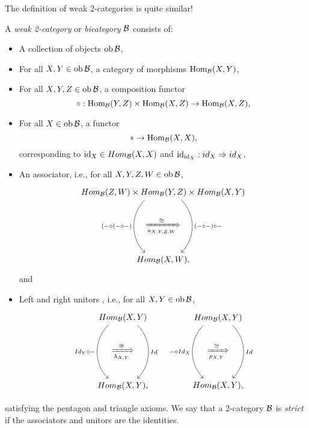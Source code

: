 The definition of weak 2-categories is quite similar!

\begin{dfn}
	A \emph{weak 2-category} or \emph{bicategory} $\mathcal{B}$ consists of:
	\begin{itemize}
		\item A collection of objects $\operatorname{ob} \mathcal{B}$,
		\item For all $X, Y \in \operatorname{ob} \mathcal{B}$, a category of morphisms $\operatorname{Hom}_{\mathcal{B}}(X, Y)$,
		\item For all $X, Y, Z \in \operatorname{ob} \mathcal{B}$, a composition functor 
		\begin{equation*}
			\circ: \operatorname{Hom}_{\mathcal{B}}(Y, Z) \times \operatorname{Hom}_{\mathcal{B}}(X, Z) \to \operatorname{Hom}_{\mathcal{B}}(X,Z),
		\end{equation*}
		\item For all $X \in \operatorname{ob} \mathcal{B}$, a functor 
		$$* \to \operatorname{Hom}_{\mathcal{B}}(X, X),$$
		corresponding to $\operatorname{id}_X\in Hom_{\mathcal{B}}(X,X)$ and $\operatorname{id}_{\operatorname{id}_X}:id_X\Rightarrow id_X$,

		\item An associator, i.e., for all $X,Y,Z,W \in \operatorname{ob} \mathcal{B}$,
		\begin{equation*}
			\begin{tikzcd}
				Hom_{\Bc}(Z,W)\times Hom_{\Bc}(Y,Z) \times Hom_{\Bc}(X,Y) \arrow[dd, shift left=-3ex, out=-135,in=135,"(-\circ(-\circ -)"']\arrow[dd, shift left=3ex, out=-45,in=45, "(-\circ -)\circ -"]\\
				\xRightarrow[a_{X,Y,Z,W}]{\cong}\\
				Hom_{\Bc}(X,W),
			\end{tikzcd}
		\end{equation*}
		and
		\item Left and right unitors , i.e., for all $X,Y \in \operatorname{ob} \mathcal{B}$,
		\begin{equation*}
			\begin{aligned}
			\begin{tikzcd}
				Hom_{\Bc}(X,Y)\arrow[dd, shift left=-2ex, out=-135,in=135,"Id_Y \circ -"']\arrow[dd, shift left=2ex, out=-45,in=45, "Id"]\\
				\xRightarrow[\lambda_{X,Y}]{\cong}\\
				Hom_{\Bc}(X,Y),
			\end{tikzcd}
			&&\begin{tikzcd}
				Hom_{\Bc}(X,Y)\arrow[dd, shift left=-2ex, out=-135,in=135,"- \circ Id_X"']\arrow[dd, shift left=2ex, out=-45,in=45, "Id"]\\
				\xRightarrow[\rho_{X,Y}]{\cong}\\
				Hom_{\Bc}(X,Y),
			\end{tikzcd}
			\end{aligned}
		\end{equation*}
	\end{itemize}
	satisfying the pentagon and triangle axioms.
	We say that a 2-category $\mathcal{B}$ is \emph{strict} if the associators and unitors are the identities.
\end{dfn}

